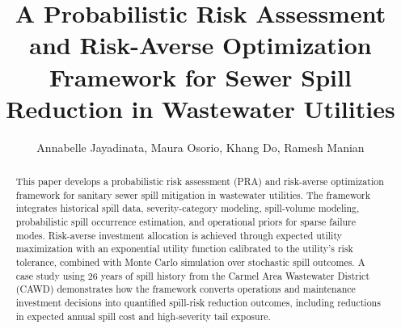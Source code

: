 \documentclass[10pt]{article}
\title{A Probabilistic Risk Assessment and Risk-Averse Optimization Framework for Sewer Spill Reduction in Wastewater Utilities}
\author{Annabelle Jayadinata, Maura Osorio, Khang Do, Ramesh Manian}
\date{}
\begin{document}
\maketitle

\begin{abstract}
This paper develops a probabilistic risk assessment (PRA) and risk-averse
optimization framework for sanitary sewer spill mitigation in wastewater
utilities. The framework integrates historical spill data, severity-category
modeling, spill-volume modeling, probabilistic spill occurrence estimation,
and operational priors for sparse failure modes. Risk-averse investment
allocation is achieved through expected utility maximization with an
exponential utility function calibrated to the utility's risk tolerance,
combined with Monte Carlo simulation over stochastic spill outcomes. A case
study using 26 years of spill history from the Carmel Area Wastewater
District (CAWD) demonstrates how the framework converts operations and
maintenance investment decisions into quantified spill-risk reduction
outcomes, including reductions in expected annual spill cost and
high-severity tail exposure.
\end{abstract}
 
\end{document}
